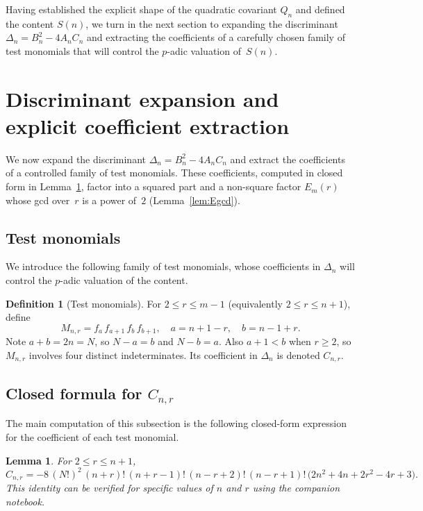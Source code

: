 \documentclass[10pt]{amsart}
\newtheorem{lemma}[theorem]{Lemma}
\theoremstyle{definition}
\newtheorem{definition}[theorem]{Definition}
\theoremstyle{remark}
\begin{document}
Having established the explicit shape of the quadratic covariant $Q_n$ and
defined the content $S(n)$, we turn in the next section to expanding the
discriminant $\Delta_n = B_n^2 - 4A_nC_n$ and extracting the coefficients
of a carefully chosen family of test monomials that will control the
$p$-adic valuation of~$S(n)$.

\section{Discriminant expansion and explicit coefficient extraction}
\label{sec:disc}

We now expand the discriminant $\Delta_n = B_n^2 - 4A_nC_n$ and extract
the coefficients of a controlled family of test monomials.  These
coefficients, computed in closed form in Lemma~\ref{lem:Cnr}, factor
into a squared part and a non-square factor $E_m(r)$ whose gcd over~$r$
is a power of~$2$ (Lemma~\ref{lem:Egcd}).

\subsection{Test monomials}

We introduce the following family of test monomials, whose coefficients in $\Delta_n$ will control the $p$-adic valuation of the content.

\begin{definition}[Test monomials]\label{def:test-monomials}
For $2 \le r \le m-1$ (equivalently $2 \le r \le n+1$), define
\[
M_{n,r} = f_a\,f_{a+1}\,f_b\,f_{b+1},\quad
a=n+1-r,\quad b=n-1+r.
\]
Note $a+b=2n=N$, so $N-a=b$ and $N-b=a$.  Also $a+1 < b$
when $r \ge 2$, so $M_{n,r}$ involves four distinct indeterminates.
Its coefficient in $\Delta_n$ is denoted $C_{n,r}$.
\end{definition}

\subsection{Closed formula for $C_{n,r}$}

The main computation of this subsection is the following closed-form expression for the coefficient of each test monomial.

\begin{lemma}\label{lem:Cnr}
For $2 \le r \le n+1$,
\begin{equation}\label{eq:Cnr}
C_{n,r} = -8\,(N!)^2\,(n+r)!\,(n+r-1)!\,(n-r+2)!\,(n-r+1)!\,
\bigl(2n^2+4n+2r^2-4r+3\bigr).
\end{equation}
This identity can be verified for specific values of $n$ and $r$ using
the companion notebook.
\end{lemma}
\end{document}
